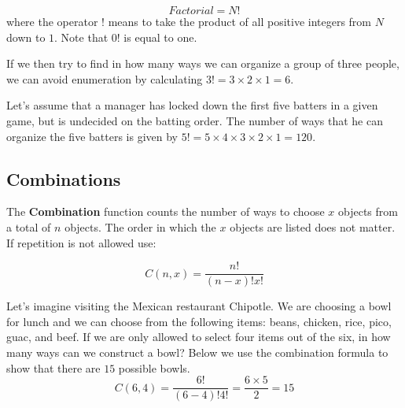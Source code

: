 \documentclass[
  11pt,
  letterpaper,
  DIV=11,
  numbers=noendperiod,
  oneside,
  open=any]{scrreprt}
\begin{document}
\begin{bsformula}

\[Factorial=N!\] where the operator \(!\) means to take the product of
all positive integers from \(N\) down to \(1\). Note that \(0!\) is
equal to one.

\end{bsformula}

If we then try to find in how many ways we can organize a group of three
people, we can avoid enumeration by calculating
\(3!=3 \times 2 \times 1=6\).

\begin{bsexample}[Example]

Let's assume that a manager has locked down the first five batters in a
given game, but is undecided on the batting order. The number of ways
that he can organize the five batters is given by
\(5!=5 \times 4 \times 3 \times 2 \times 1=120\).

\end{bsexample}

\subsection*{Combinations}\label{combinations}

The \textbf{Combination} function counts the number of ways to choose
\(x\) objects from a total of \(n\) objects. The order in which the
\(x\) objects are listed does not matter. If repetition is not allowed
use:

\begin{bsformula}

\[C(n, x)= \frac{n!}{(n-x)!x!}\]

\end{bsformula}

\begin{bsexample}[Example]

Let's imagine visiting the Mexican restaurant Chipotle. We are choosing
a bowl for lunch and we can choose from the following items: beans,
chicken, rice, pico, guac, and beef. If we are only allowed to select
four items out of the six, in how many ways can we construct a bowl?
Below we use the combination formula to show that there are \(15\)
possible bowls. \[C(6, 4)= \frac{6!}{(6-4)!4!}=\frac{6 \times 5}{2}=15\]

\end{bsexample}
\end{document}
